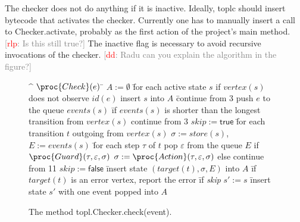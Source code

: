 \documentclass{sigplanconf}[10pt] %
\newcommand{\noterg}[2]{\textcolor{gray}{[\textcolor{red}{#1}: #2]}}
\newcommand{\rlp}[1]{\noterg{rlp}{#1}}
\newcommand{\dd}[1]{\noterg{dd}{#1}}
\begin{document}
The checker does not do anything if it is inactive.
Ideally, \textsf{toplc} should insert bytecode that activates the checker.
Currently one has to manually insert a call to
\textsf{Checker.activate}, probably as the first action of the
project's \textsf{main} method.\rlp{Is this still true?}
The inactive flag is necessary to avoid recursive invocations of the checker.
\dd{Radu can you explain the algorithm in the figure?}
\begin{figure}[htbp]
\begin{center}
\begin{alg}
\^  $\proc{Check}(e)$
\=  $A := \emptyset$
\=  for each active state $s$
\+    if $\mathit{vertex}(s)$ does not observe $\mathit{id}(e)$
\+      insert $s$ into $A$
\=      continue from $3$
\-    push $e$ to the queue $\mathit{events}(s)$
\=    if $\mathit{events}(s)$ is shorter than the longest transition from $\mathit{vertex}(s)$
\+      continue from $3$
\1    $\mathit{skip}:=\mathsf{true}$
\=    for each transition $t$ outgoing from $\mathit{vertex}(s)$
\+      $\sigma := \mathit{store}(s)$,\quad $E := \mathit{events}(s)$
\=      for each step $\tau$ of $t$
\+        pop $\varepsilon$ from the queue $E$
\+        if $\proc{Guard}(\tau, \varepsilon, \sigma)$
\+          $\sigma := \proc{Action}(\tau, \varepsilon, \sigma)$
\-        else
\+          continue from 11
\2      $\mathit{skip}:=\mathsf{false}$
\=      insert state $(\mathit{target}(t), \sigma, E)$ into $A$
\=      if $\mathit{target}(t)$ is an error vertex, report the error
\=      if \textit{skip}
\+        $s' := s$
\=        insert state $s'$ with one event popped into $A$
\end{alg}
\caption{The method \textsf{topl.Checker.check(event)}.}
\label{checker.check}
\end{center}
\end{figure}

\end{document}

